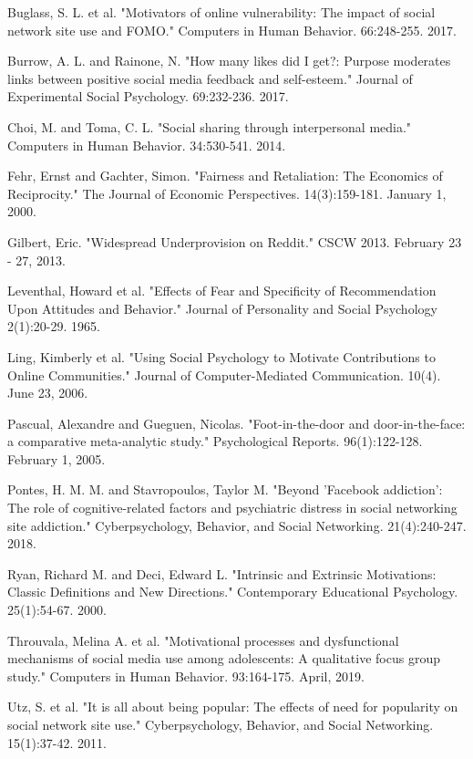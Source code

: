 \documentclass[class=book, crop=false]{standalone}
\begin{document}
Buglass, S. L. et al. "Motivators of online vulnerability: The impact of social network site use and FOMO." Computers in Human Behavior. 66:248-255. 2017.

Burrow, A. L. and Rainone, N. "How many likes did I get?: Purpose moderates links between positive social media feedback and self-esteem." Journal of Experimental Social Psychology. 69:232-236. 2017.

Choi, M. and Toma, C. L. "Social sharing through interpersonal media." Computers in Human Behavior. 34:530-541. 2014.

Fehr, Ernst and Gachter, Simon. "Fairness and Retaliation: The Economics of Reciprocity." The Journal of Economic Perspectives. 14(3):159-181. January 1, 2000.

Gilbert, Eric. "Widespread Underprovision on Reddit." CSCW 2013. February 23 - 27, 2013.

Leventhal, Howard et al. "Effects of Fear and Specificity of Recommendation Upon Attitudes and Behavior." Journal of Personality and Social Psychology 2(1):20-29. 1965.

Ling, Kimberly et al. "Using Social Psychology to Motivate Contributions to Online Communities." Journal of Computer-Mediated Communication. 10(4). June 23, 2006.

Pascual, Alexandre and Gueguen, Nicolas. "Foot-in-the-door and door-in-the-face: a comparative meta-analytic study." Psychological Reports. 96(1):122-128. February 1, 2005.

Pontes, H. M. M. and Stavropoulos, Taylor M. "Beyond 'Facebook addiction': The role of cognitive-related factors and psychiatric distress in social networking site addiction." Cyberpsychology, Behavior, and Social Networking. 21(4):240-247. 2018.

Ryan, Richard M. and Deci, Edward L. "Intrinsic and Extrinsic Motivations: Classic Definitions and New Directions." Contemporary Educational Psychology. 25(1):54-67. 2000.

Throuvala, Melina A. et al. "Motivational processes and dysfunctional mechanisms of social media use among adolescents: A qualitative focus group study." Computers in Human Behavior. 93:164-175. April, 2019.

Utz, S. et al. "It is all about being popular: The effects of need for popularity on social network site use." Cyberpsychology, Behavior, and Social Networking. 15(1):37-42. 2011.
\end{document}
